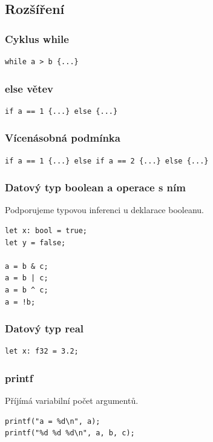 \documentclass[12pt,a4paper]{article}
\begin{document}
\subsection{Rozšíření}

\subsubsection*{Cyklus while}

\begin{verbatim}
while a > b {...}
\end{verbatim}

\subsubsection*{else větev}

\begin{verbatim}
if a == 1 {...} else {...}
\end{verbatim}

\subsubsection*{Vícenásobná podmínka}

\begin{verbatim}
if a == 1 {...} else if a == 2 {...} else {...}
\end{verbatim}

\subsubsection*{Datový typ boolean a operace s ním}
Podporujeme typovou inferenci u deklarace booleanu.
\begin{verbatim}
let x: bool = true;
let y = false;

a = b & c;
a = b | c;
a = b ^ c;
a = !b;
\end{verbatim}

\subsubsection*{Datový typ real}

\begin{verbatim}
let x: f32 = 3.2;
\end{verbatim}

\subsubsection*{printf}
Příjímá variabilní počet argumentů.
\begin{verbatim}
printf("a = %d\n", a);
printf("%d %d %d\n", a, b, c);
\end{verbatim}
\end{document}
